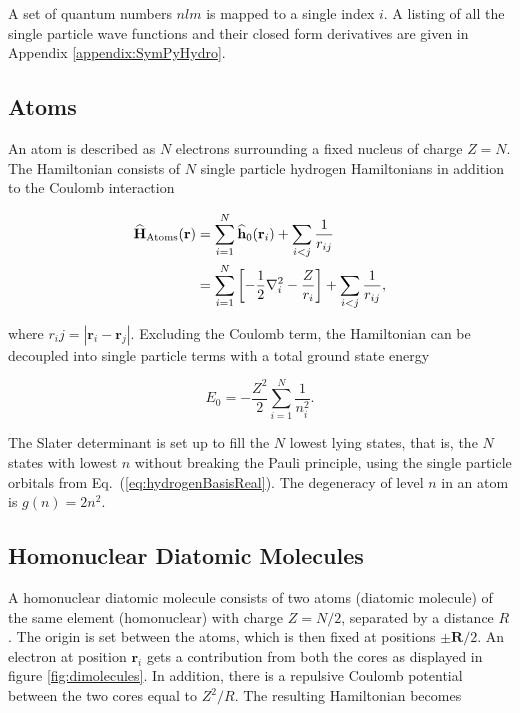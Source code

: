 A set of quantum numbers $nlm$ is mapped to a single index $i$. A listing of all the single particle wave functions and their closed form derivatives are given in Appendix \ref{appendix:SymPyHydro}.

\subsection{Atoms}

An atom is described as $N$ electrons surrounding a fixed nucleus of charge $Z=N$. The Hamiltonian consists of $N$ single particle hydrogen Hamiltonians in addition to the Coulomb interaction

\begin{align}
 {\bf\widehat{H}}_{\mathrm{Atoms}}(\mathbf{r}) &= \sum_{i=1}^N {\bf\widehat{h}}_0(\mathbf{r}_i) + \sum_{i<j} \frac{1}{r_{ij}} \\
                         &= \sum_{i=1}^N \left[-\frac{1}{2}\nabla_i^2 - \frac{Z}{r_i}\right] + \sum_{i<j} \frac{1}{r_{ij}},
\end{align}

where $r_ij = |\mathbf{r}_i -\mathbf{r}_j|$. Excluding the Coulomb term, the Hamiltonian can be decoupled into single particle terms with a total ground state energy

\begin{equation}
 E_0 = -\frac{Z^2}{2}\sum_{i=1}^N \frac{1}{n_i^2}. \label{eq:atomsE0}
\end{equation}

The Slater determinant is set up to fill the $N$ lowest lying states, that is, the $N$ states with lowest $n$ without breaking the Pauli principle, using the single particle orbitals from Eq.~(\ref{eq:hydrogenBasisReal}). The degeneracy of level $n$ in an atom is $g(n) = 2n^2$.

\subsection{Homonuclear Diatomic Molecules}

A homonuclear diatomic molecule consists of two atoms (diatomic molecule) of the same element (homonuclear) with charge $Z=N/2$, separated by a distance $R$. The origin is set between the atoms, which is then fixed at positions $\pm \mathbf{R}/2$. An electron at position $\mathbf{r}_i$ gets a contribution from both the cores as displayed in figure \ref{fig:dimolecules}. In addition, there is a repulsive Coulomb potential between the two cores equal to $Z^2/R$. The resulting Hamiltonian becomes

